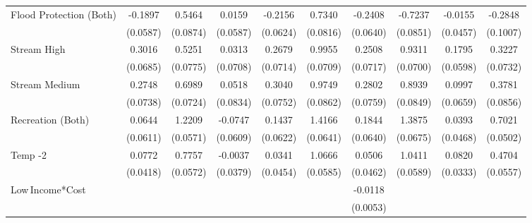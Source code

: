 {\begin{tabular}{l*{9}{c}}
Flood Protection (Both)&  -0.1897\sym{***}&   0.5464\sym{***}&   0.0159         &  -0.2156\sym{***}&   0.7340\sym{***}&  -0.2408\sym{***}&  -0.7237\sym{***}&  -0.0155         &  -0.2848\sym{***}\\
                & (0.0587)         & (0.0874)         & (0.0587)         & (0.0624)         & (0.0816)         & (0.0640)         & (0.0851)         & (0.0457)         & (0.1007)         \\
Stream High     &   0.3016\sym{***}&   0.5251\sym{***}&   0.0313         &   0.2679\sym{***}&   0.9955\sym{***}&   0.2508\sym{***}&   0.9311\sym{***}&   0.1795\sym{***}&   0.3227\sym{***}\\
                & (0.0685)         & (0.0775)         & (0.0708)         & (0.0714)         & (0.0709)         & (0.0717)         & (0.0700)         & (0.0598)         & (0.0732)         \\
Stream Medium   &   0.2748\sym{***}&   0.6989\sym{***}&   0.0518         &   0.3040\sym{***}&   0.9749\sym{***}&   0.2802\sym{***}&   0.8939\sym{***}&   0.0997         &   0.3781\sym{***}\\
                & (0.0738)         & (0.0724)         & (0.0834)         & (0.0752)         & (0.0862)         & (0.0759)         & (0.0849)         & (0.0659)         & (0.0856)         \\
Recreation (Both)&   0.0644         &   1.2209\sym{***}&  -0.0747         &   0.1437\sym{**} &   1.4166\sym{***}&   0.1844\sym{***}&   1.3875\sym{***}&   0.0393         &   0.7021\sym{***}\\
                & (0.0611)         & (0.0571)         & (0.0609)         & (0.0622)         & (0.0641)         & (0.0640)         & (0.0675)         & (0.0468)         & (0.0502)         \\
Temp -2         &   0.0772\sym{*}  &   0.7757\sym{***}&  -0.0037         &   0.0341         &   1.0666\sym{***}&   0.0506         &   1.0411\sym{***}&   0.0820\sym{**} &   0.4704\sym{***}\\
                & (0.0418)         & (0.0572)         & (0.0379)         & (0.0454)         & (0.0585)         & (0.0462)         & (0.0589)         & (0.0333)         & (0.0557)         \\
Low\,Income*Cost &                  &                  &                  &                  &                  &  -0.0118\sym{**} &                  &                  &                  \\
                &                  &                  &                  &                  &                  & (0.0053)         &                  &                  &                  \\

\end{tabular}}
